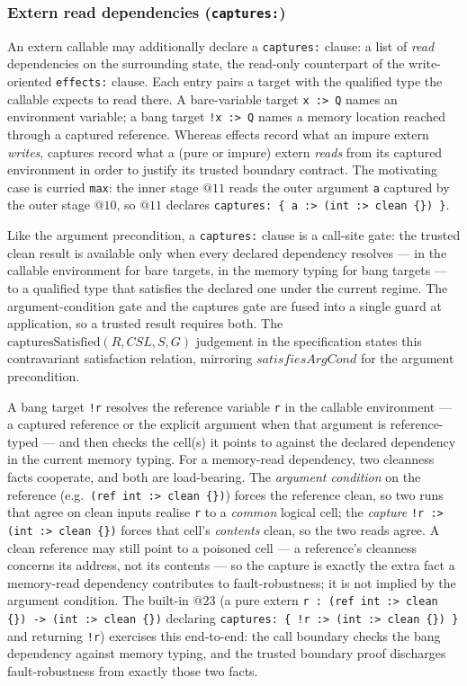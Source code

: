 \documentclass[12pt]{article}
\begin{document}
\subsubsection*{Extern read dependencies (\texttt{captures:})}
\label{sec:extern-captures}

An extern callable may additionally declare a \texttt{captures:} clause: a list
of \emph{read} dependencies on the surrounding state, the read-only counterpart
of the write-oriented \texttt{effects:} clause. Each entry pairs a target with
the qualified type the callable expects to read there. A bare-variable target
\texttt{x :> Q} names an environment variable; a bang target \texttt{!x :> Q}
names a memory location reached through a captured reference. Whereas effects
record what an impure extern \emph{writes}, captures record what a (pure or
impure) extern \emph{reads} from its captured environment in order to justify
its trusted boundary contract. The motivating case is curried \texttt{max}: the
inner stage \(@11\) reads the outer argument \texttt{a} captured by the outer
stage \(@10\), so \(@11\) declares \texttt{captures: \{ a :> (int :> clean
\{\}) \}}.

Like the argument precondition, a \texttt{captures:} clause is a call-site gate:
the trusted clean result is available only when every declared dependency
resolves --- in the callable environment for bare targets, in the memory typing
for bang targets --- to a qualified type that satisfies the declared one under
the current regime. The argument-condition gate and the captures gate are fused
into a single guard at application, so a trusted result requires both. The
\(\mathrm{capturesSatisfied}(R, \mathit{CSL}, S, G)\) judgement in the specification
states this contravariant satisfaction relation, mirroring
\(\mathit{satisfiesArgCond}\) for the argument precondition.

A bang target \texttt{!r} resolves the reference variable \texttt{r} in the
callable environment --- a captured reference or the explicit argument when that
argument is reference-typed --- and then checks the cell(s) it points to against
the declared dependency in the current memory typing. For a memory-read
dependency, two cleanness facts cooperate, and both are load-bearing. The
\emph{argument condition} on the reference (e.g.\ \texttt{(ref int :> clean
\{\})}) forces the reference clean, so two runs that agree on clean inputs realise
\texttt{r} to a \emph{common} logical cell; the \emph{capture} \texttt{!r :> (int
:> clean \{\})} forces that cell's \emph{contents} clean, so the two reads agree.
A clean reference may still point to a poisoned cell --- a reference's cleanness
concerns its address, not its contents --- so the capture is exactly the extra
fact a memory-read dependency contributes to fault-robustness; it is not implied
by the argument condition. The built-in \(@23\) (a pure extern \texttt{r : (ref
int :> clean \{\}) -> (int :> clean \{\})} declaring \texttt{captures: \{ !r :>
(int :> clean \{\}) \}} and returning \texttt{!r}) exercises this end-to-end:
the call boundary checks the bang dependency against memory typing, and the
trusted boundary proof discharges fault-robustness from exactly those two facts.
\end{document}
